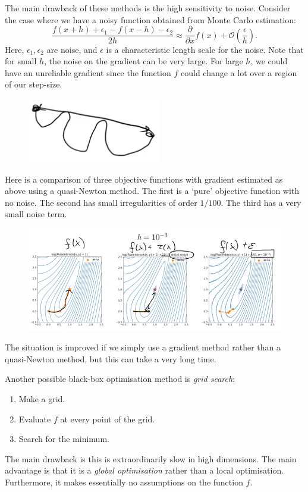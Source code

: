 The main drawback of these methods is the high sensitivity to noise. Consider the case where we have a noisy function obtained from Monte Carlo estimation:
\begin{equation*}
\frac{f(x+h) + \epsilon_1 - f(x-h) - \epsilon_2}{2h} \approx \frac{\partial}{\partial x} f(x) + \mathcal{O}\left( \frac{\epsilon}{h} \right).
\end{equation*}
Here, $\epsilon_1, \epsilon_2$ are noise, and $\epsilon$ is a characteristic length scale for the noise. Note that for small $h$, the noise on the gradient can be very large. For large $h$, we could have an unreliable gradient since the function $f$ could change a lot over a region of our step-size.
\begin{figure}[H]
\centering
\includegraphics[scale=0.4]{largeh.png}
\end{figure}

Here is a comparison of three objective functions with gradient estimated as above using a quasi-Newton method. The first is a `pure' objective function with  no noise. The second has small irregularities of order $1/100$. The third has a very small noise term. 

\begin{figure}[H]
\centering
\includegraphics[scale=0.4]{noisyobjective.png}
\end{figure}

The situation is improved if we simply use a gradient method rather than a quasi-Newton method, but this can take a very long time.



\newpage
Another possible black-box optimisation method is \textit{grid search}:
\begin{enumerate}
\item Make a grid.
\item Evaluate $f$ at every point of the grid.
\item Search for the minimum.
\end{enumerate}
The main drawback is this is extraordinarily slow in high dimensions. The main advantage is that it is a \textit{global optimisation} rather than a local optimisation. Furthermore, it makes essentially no assumptions on the function $f$.

